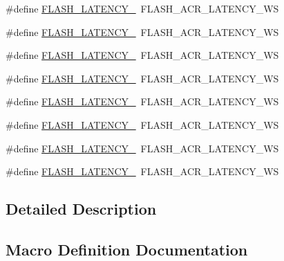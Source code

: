 \begin{DoxyCompactItemize}
\#define \mbox{\hyperlink{group___f_l_a_s_h___latency_ga50fca6ee68a03a46093ddd1aad0a604b}{F\+L\+A\+S\+H\+\_\+\+L\+A\+T\+E\+N\+C\+Y\+\_}}~F\+L\+A\+S\+H\+\_\+\+A\+C\+R\+\_\+\+L\+A\+T\+E\+N\+C\+Y\+\_\+WS
\item 
\#define \mbox{\hyperlink{group___f_l_a_s_h___latency_gac7d2f544eb57b8bc1d1c09d541963b3d}{F\+L\+A\+S\+H\+\_\+\+L\+A\+T\+E\+N\+C\+Y\+\_}}~F\+L\+A\+S\+H\+\_\+\+A\+C\+R\+\_\+\+L\+A\+T\+E\+N\+C\+Y\+\_\+WS
\item 
\#define \mbox{\hyperlink{group___f_l_a_s_h___latency_ga952e79cae902b129bf4b80de551a99f0}{F\+L\+A\+S\+H\+\_\+\+L\+A\+T\+E\+N\+C\+Y\+\_}}~F\+L\+A\+S\+H\+\_\+\+A\+C\+R\+\_\+\+L\+A\+T\+E\+N\+C\+Y\+\_\+WS
\item 
\#define \mbox{\hyperlink{group___f_l_a_s_h___latency_ga235a33dd983649073f34c116c652d96a}{F\+L\+A\+S\+H\+\_\+\+L\+A\+T\+E\+N\+C\+Y\+\_}}~F\+L\+A\+S\+H\+\_\+\+A\+C\+R\+\_\+\+L\+A\+T\+E\+N\+C\+Y\+\_\+WS
\item 
\#define \mbox{\hyperlink{group___f_l_a_s_h___latency_ga20112b2d31eba4cd95f777c1f8114d9e}{F\+L\+A\+S\+H\+\_\+\+L\+A\+T\+E\+N\+C\+Y\+\_}}~F\+L\+A\+S\+H\+\_\+\+A\+C\+R\+\_\+\+L\+A\+T\+E\+N\+C\+Y\+\_\+WS
\item 
\#define \mbox{\hyperlink{group___f_l_a_s_h___latency_ga38e8648bb8eda820024540149ffd6862}{F\+L\+A\+S\+H\+\_\+\+L\+A\+T\+E\+N\+C\+Y\+\_}}~F\+L\+A\+S\+H\+\_\+\+A\+C\+R\+\_\+\+L\+A\+T\+E\+N\+C\+Y\+\_\+WS
\item 
\#define \mbox{\hyperlink{group___f_l_a_s_h___latency_gaf8e5bf2f7815e848d1fd17c0bceb6cbc}{F\+L\+A\+S\+H\+\_\+\+L\+A\+T\+E\+N\+C\+Y\+\_}}~F\+L\+A\+S\+H\+\_\+\+A\+C\+R\+\_\+\+L\+A\+T\+E\+N\+C\+Y\+\_\+WS
\item 
\#define \mbox{\hyperlink{group___f_l_a_s_h___latency_ga1ab3df3c865f316286cc653a7e8a6b5a}{F\+L\+A\+S\+H\+\_\+\+L\+A\+T\+E\+N\+C\+Y\+\_}}~F\+L\+A\+S\+H\+\_\+\+A\+C\+R\+\_\+\+L\+A\+T\+E\+N\+C\+Y\+\_\+WS
\end{DoxyCompactItemize}


\subsection{Detailed Description}


\subsection{Macro Definition Documentation}
\mbox{\label{group___f_l_a_s_h___latency_ga1276f51e97dc9857ca261fae4eb890f3}} 
